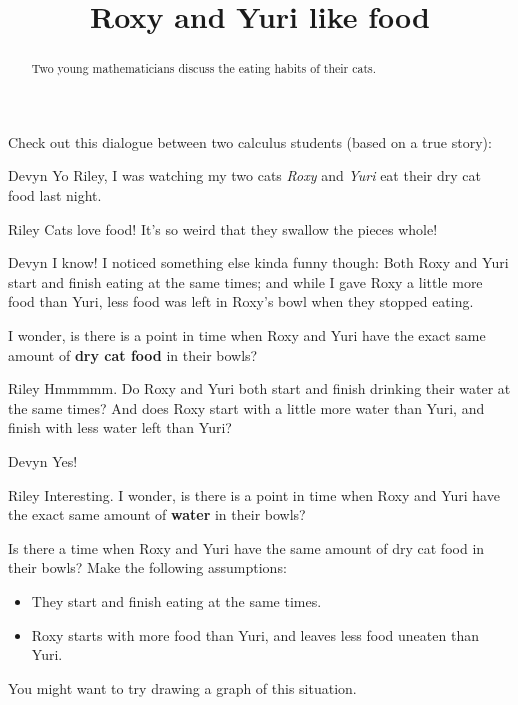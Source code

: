 \documentclass{ximera}
\title[Break-Ground:]{Roxy and Yuri like food}
\begin{document}
\begin{abstract}
Two young mathematicians discuss the eating habits of their cats.
\end{abstract}
\maketitle

Check out this dialogue between two calculus students (based on a true
story):

\begin{dialogue}
\item[Devyn] Yo Riley, I was watching my two cats
  \textit{Roxy} and \textit{Yuri} eat their dry cat food last night.
\item[Riley] Cats love food!  It's so weird that they swallow the pieces whole!
\item[Devyn] I know! I noticed something else kinda funny though:
  Both Roxy and Yuri start and finish eating at the same times; and
  while I gave Roxy a little more food than Yuri, less food was left
  in Roxy's bowl when they stopped eating.

  I wonder, is there is a point in time when Roxy and Yuri have the
  exact same amount of \textbf{dry cat food} in their bowls?
\item[Riley] Hmmmmm. Do Roxy and Yuri both start and finish
  drinking their water at the same times?  And does Roxy start with a
  little more water than Yuri, and finish with less water left than
  Yuri?
\item[Devyn] Yes!
\item[Riley] Interesting. I wonder, is there is a point in
  time when Roxy and Yuri have the exact same amount of \textbf{water}
  in their bowls?
\end{dialogue}

\begin{problem}
  Is there a time when Roxy and Yuri have the same amount of dry cat
  food in their bowls? Make the following assumptions:
  \begin{itemize}
  \item They start and finish eating at the same times.
  \item Roxy starts with more food than Yuri, and leaves less food uneaten than Yuri. 
  \end{itemize}
  \begin{hint}
  	You might want to try drawing a graph of this situation.
  \end{hint}
  \begin{prompt}
  \begin{multipleChoice}
  \end{multipleChoice}
  \end{prompt}
\end{problem}
\end{document}
